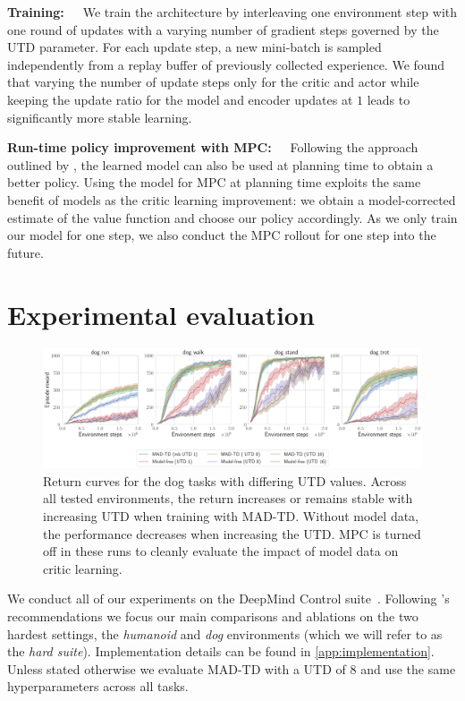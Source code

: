 \textbf{Training:}~~~We train the architecture by interleaving one environment step with one round of updates with a varying number of gradient steps governed by the UTD parameter.
For each update step, a new mini-batch is sampled independently from a replay buffer of previously collected experience.
We found that varying the number of update steps only for the critic and actor while keeping the update ratio for the model and encoder updates at $1$ leads to significantly more stable learning.

\textbf{Run-time policy improvement with MPC:}~~~Following the approach outlined by  \textcite{hansen2022temporal}, the learned model can also be used at planning time to obtain a better policy.
Using the model for MPC at planning time exploits the same benefit of models as the critic learning improvement: we obtain a model-corrected estimate of the value function and choose our policy accordingly.
As we only train our model for one step, we also conduct the MPC rollout for one step into the future.


\section{Experimental evaluation}

\begin{figure}[t]
    \centering
    \includegraphics[width=1.0\linewidth]{figures/mad-td/dog_utd_comp.pdf}
    \caption{Return curves for the dog tasks with differing UTD values. Across all tested environments, the return increases or remains stable with increasing UTD when training with MAD-TD. Without model data, the performance decreases when increasing the UTD. MPC is turned off in these runs to cleanly evaluate the impact of model data on critic learning.}
    \label{fig:mad:main_dog}
\end{figure}


We conduct all of our experiments on the DeepMind Control suite~\parencite{tunyasuvunakool2020dmcontrol}. Following \textcite{nauman2024bigger}'s recommendations we focus our main comparisons and ablations on the two hardest settings, the \emph{humanoid} and \emph{dog} environments (which we will refer to as the \emph{hard suite}).
Implementation details can be found in \autoref{app:implementation}.
Unless stated otherwise we evaluate MAD-TD with a UTD of 8 and use the same hyperparameters across all tasks.

